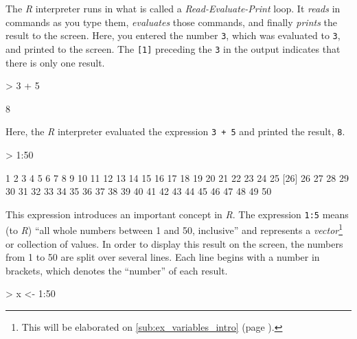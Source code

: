 \documentclass[10pt,letterpaper]{article}
\begin{document}
The \emph{R} interpreter runs in what is called a \emph{Read-Evaluate-Print} loop.  It \emph{reads} in commands as you type them, \emph{evaluates} those commands, and finally \emph{prints} the result to the screen.  Here, you entered the number \texttt{3}, which was evaluated to \texttt{3}, and printed to the screen.  The \texttt{[1]} preceding the \texttt{3} in the output indicates that there is only one result.

\begin{Schunk}
\begin{Sinput}
> 3 + 5
\end{Sinput}
\begin{Soutput}
[1] 8
\end{Soutput}
\end{Schunk}

Here, the \emph{R} interpreter evaluated the expression \texttt{3 + 5} and printed the result, \texttt{8}.

\begin{Schunk}
\begin{Sinput}
> 1:50
\end{Sinput}
\begin{Soutput}
 [1]  1  2  3  4  5  6  7  8  9 10 11 12 13 14 15 16 17 18 19 20 21 22 23 24 25
[26] 26 27 28 29 30 31 32 33 34 35 36 37 38 39 40 41 42 43 44 45 46 47 48 49 50
\end{Soutput}
\end{Schunk}

This expression introduces an important concept in \emph{R}.  The expression \texttt{1:5} means (to \emph{R}) ``all whole numbers between 1 and 50, inclusive'' and represents a \emph{vector}\footnote{This will be elaborated on \ref{sub:ex_variables_intro} (page \pageref{sub:ex_variables_intro}).} or collection of values.  In order to display this result on the screen, the numbers from 1 to 50 are split over several lines.  Each line begins with a number in brackets, which denotes the ``number'' of each result.

\begin{Schunk}
\begin{Sinput}
> x <- 1:50
\end{Sinput}
\end{Schunk}
\end{document}
